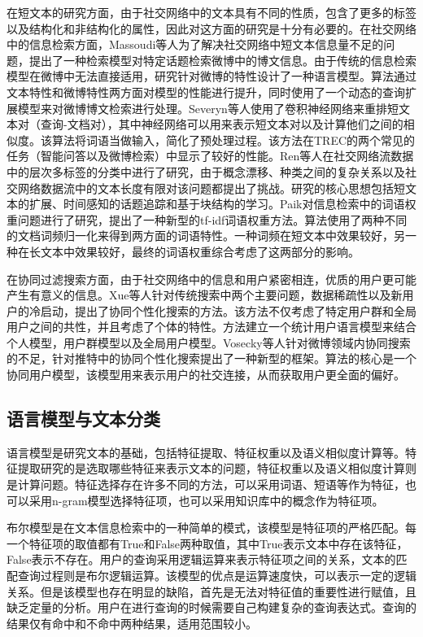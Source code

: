 在短文本的研究方面，由于社交网络中的文本具有不同的性质，包含了更多的标签以及结构化和非结构化的属性，因此对这方面的研究是十分有必要的。在社交网络中的信息检索方面，Massoudi等人为了解决社交网络中短文本信息量不足的问题，提出了一种检索模型对特定话题检索微博中的博文信息。由于传统的信息检索模型在微博中无法直接适用，研究针对微博的特性设计了一种语言模型。算法通过文本特性和微博特性两方面对模型的性能进行提升，同时使用了一个动态的查询扩展模型来对微博博文检索进行处理。Severyn等人使用了卷积神经网络来重排短文本对（查询-文档对），其中神经网络可以用来表示短文本对以及计算他们之间的相似度。该算法将词语当做输入，简化了预处理过程。该方法在TREC的两个常见的任务（智能问答以及微博检索）中显示了较好的性能。Ren等人在社交网络流数据中的层次多标签的分类中进行了研究，由于概念漂移、种类之间的复杂关系以及社交网络数据流中的文本长度有限对该问题都提出了挑战。研究的核心思想包括短文本的扩展、时间感知的话题追踪和基于块结构的学习。Paik对信息检索中的词语权重问题进行了研究，提出了一种新型的tf-idf词语权重方法。算法使用了两种不同的文档词频归一化来得到两方面的词语特性。一种词频在短文本中效果较好，另一种在长文本中效果较好，最终的词语权重综合考虑了这两部分的影响。

在协同过滤搜索方面，由于社交网络中的信息和用户紧密相连，优质的用户更可能产生有意义的信息。Xue等人针对传统搜索中两个主要问题，数据稀疏性以及新用户的冷启动，提出了协同个性化搜索的方法。该方法不仅考虑了特定用户群和全局用户之间的共性，并且考虑了个体的特性。方法建立一个统计用户语言模型来结合个人模型，用户群模型以及全局用户模型。Vosecky等人针对微博领域内协同搜索的不足，针对推特中的协同个性化搜索提出了一种新型的框架。算法的核心是一个协同用户模型，该模型用来表示用户的社交连接，从而获取用户更全面的偏好。

\subsection{语言模型与文本分类}
\label{subsec1:textClassification}
语言模型是研究文本的基础，包括特征提取、特征权重以及语义相似度计算等。特征提取研究的是选取哪些特征来表示文本的问题，特征权重以及语义相似度计算则是计算问题。特征选择存在许多不同的方法，可以采用词语、短语等作为特征，也可以采用n-gram模型选择特征项，也可以采用知识库中的概念作为特征项。

布尔模型是在文本信息检索中的一种简单的模式，该模型是特征项的严格匹配。每一个特征项的取值都有True和False两种取值，其中True表示文本中存在该特征，False表示不存在。用户的查询采用逻辑运算来表示特征项之间的关系，文本的匹配查询过程则是布尔逻辑运算。该模型的优点是运算速度快，可以表示一定的逻辑关系。但是该模型也存在明显的缺陷，首先是无法对特征值的重要性进行赋值，且缺乏定量的分析。用户在进行查询的时候需要自己构建复杂的查询表达式。查询的结果仅有命中和不命中两种结果，适用范围较小。

